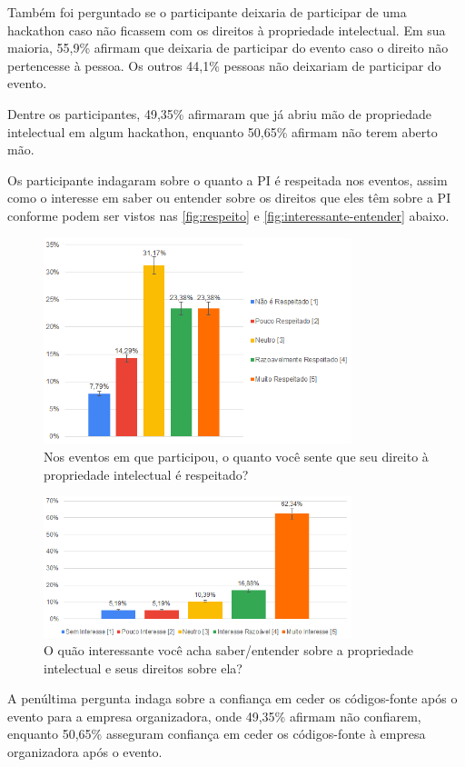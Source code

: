 Também foi perguntado se o participante deixaria de participar de uma hackathon caso não ficassem com os direitos à propriedade intelectual. Em sua maioria, 55,9\% afirmam que deixaria de participar do evento caso o direito não pertencesse à pessoa. Os outros 44,1\% pessoas não deixariam de participar do evento.

Dentre os participantes, 49,35\% afirmaram que já abriu mão de propriedade intelectual em algum hackathon, enquanto 50,65\% afirmam não terem aberto mão. %

Os participante indagaram sobre o quanto a PI é respeitada nos eventos, assim como o interesse em saber ou entender sobre os direitos que eles têm sobre a PI conforme podem ser vistos nas \autoref{fig:respeito} e \autoref{fig:interessante-entender} abaixo. %

\begin{figure}[H]
    \centering
    \includegraphics[width=0.8\textwidth]{images/PIrespeitada.png}
    \caption{Nos eventos em que participou, o quanto você sente que seu direito à propriedade intelectual é respeitado?}
    \label{fig:respeito}
\end{figure}



\begin{figure}[H]
    \centering
    \includegraphics[width=0.8\textwidth]{images/interesseAprender.png}
    \caption{O quão interessante você acha saber/entender sobre a propriedade intelectual e seus direitos sobre ela?}
    \label{fig:interessante-entender}
\end{figure}



A penúltima pergunta indaga sobre a confiança em ceder os códigos-fonte após o evento para a empresa organizadora, onde 49,35\% afirmam não confiarem, enquanto 50,65\% asseguram confiança em ceder os códigos-fonte à empresa organizadora após o evento.
